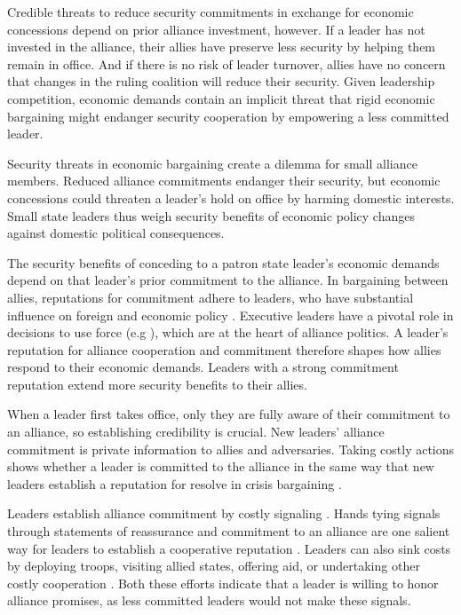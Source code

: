\documentclass[12pt]{article}
\begin{document}
Credible threats to reduce security commitments in exchange for economic concessions depend on prior alliance investment, however. 
If a leader has not invested in the alliance, their allies have preserve less security by helping them remain in office. 
And if there is no risk of leader turnover, allies have no concern that changes in the ruling coalition will reduce their security. 
Given leadership competition, economic demands contain an implicit threat that rigid economic bargaining might endanger security cooperation by empowering a less committed leader.


Security threats in economic bargaining create a dilemma for small alliance members. 
Reduced alliance commitments endanger their security, but economic concessions could threaten a leader's hold on office by harming domestic interests. 
Small state leaders thus weigh security benefits of economic policy changes against domestic political consequences.


The security benefits of conceding to a patron state leader's economic demands depend on that leader's prior commitment to the alliance. 
In bargaining between allies, reputations for commitment adhere to leaders, who have substantial influence on foreign and economic policy \citep{Renshonetal2018}.
Executive leaders have a pivotal role in decisions to use force (e.g \citep{Colgan2013, ColganWeeks2015}), which are at the heart of alliance politics.
A leader's reputation for alliance cooperation and commitment therefore shapes how allies respond to their economic demands. 
Leaders with a strong commitment reputation extend more security benefits to their allies. 


When a leader first takes office, only they are fully aware of their commitment to an alliance, so establishing credibility is crucial. 
New leaders' alliance commitment is private information to allies and adversaries. 
Taking costly actions shows whether a leader is committed to the alliance in the same way that new leaders establish a reputation for resolve in crisis bargaining \citep{Wolford2007}. 


Leaders establish alliance commitment by costly signaling \citep{Fearon1997}. 
Hands tying signals through statements of reassurance and commitment to an alliance are one salient way for leaders to establish a cooperative reputation \citep{Blankenship2020}.
Leaders can also sink costs by deploying troops, visiting allied states, offering aid, or undertaking other costly cooperation \citep{McManusNieman2019}.
Both these efforts indicate that a leader is willing to honor alliance promises, as less committed leaders would not make these signals.
\end{document}
